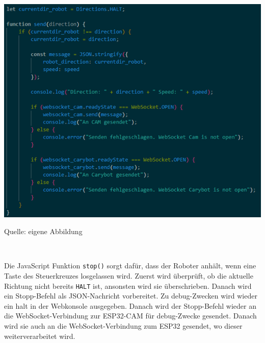 \documentclass[ngerman,12pt,a4paper]{article}
\begin{document}
	\begin{center}
		\begin{minipage}[t]{0.75\textwidth}
			\includegraphics[scale=0.7]{Pictures/Steuerung-js3}
			\label{fig:Steuerkreuz-js3}
			\vspace{-10pt}
			\begin{center}
				\par\small Quelle: eigene Abbildung 
			\end{center}
		\end{minipage} \\[0.75cm]
	\end{center}
	Die JavaScript Funktion \texttt{stop()} sorgt dafür, dass der Roboter anhält, wenn eine Taste des Steuerkreuzes losgelassen wird. Zuerst wird überprüft, ob die aktuelle Richtung nicht bereits \texttt{HALT} ist, ansonsten wird sie überschrieben. Danach wird ein Stopp-Befehl als JSON-Nachricht vorbereitet. Zu debug-Zwecken wird wieder ein halt in der Webkonsole ausgegeben. Danach wird der Stopp-Befehl wieder an die WebSocket-Verbindung zur ESP32-CAM für debug-Zwecke gesendet. Danach wird sie auch an die WebSocket-Verbindung zum ESP32 gesendet, wo dieser weiterverarbeitet wird. \\[0.5cm]
\end{document}
